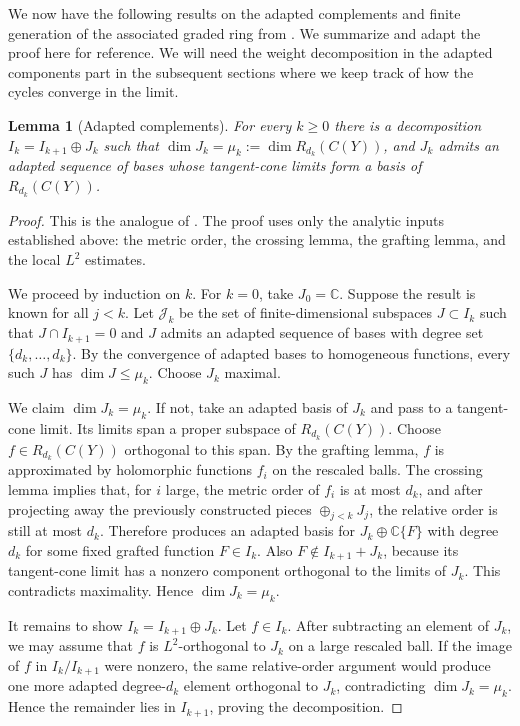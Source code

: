 \documentclass[11pt]{amsart}
\newtheorem{lemma}[theorem]{Lemma}
\theoremstyle{definition}
\theoremstyle{remark}
\begin{document}
We now have the following results on the adapted complements and finite generation
of the associated graded ring from \cite[Section~3.2]{DSII}. We summarize and adapt the proof here for reference. We will need the weight decomposition in the adapted components part in the
subsequent sections where we keep track of how the cycles converge in the limit.

\begin{lemma}[Adapted complements]
For every $k\geq0$ there is a decomposition $I_k=I_{k+1}\oplus J_k$ such that
$\dim J_k=\mu_k:=\dim R_{d_k}(C(Y))$, and $J_k$ admits an adapted sequence of
bases whose tangent-cone limits form a basis of $R_{d_k}(C(Y))$.
\end{lemma}

\begin{proof}
This is the analogue of \cite[Proposition 3.14]{DSII}. The proof uses only the
analytic inputs established above: the metric order, the crossing lemma, the
grafting lemma, and the local $L^2$ estimates.

We proceed by induction on $k$. For $k=0$, take $J_0=\mathbb C$. Suppose the
result is known for all $j<k$. Let $\mathcal J_k$ be the set of finite-dimensional
subspaces $J\subset I_k$ such that $J\cap I_{k+1}=0$ and $J$ admits an adapted
sequence of bases with degree set $\{d_k,\dots,d_k\}$. By the convergence of
adapted bases to homogeneous functions, every such $J$ has $\dim J\leq\mu_k$.
Choose $J_k$ maximal.

We claim $\dim J_k=\mu_k$. If not, take an adapted basis of $J_k$ and pass to a
tangent-cone limit. Its limits span a proper subspace of $R_{d_k}(C(Y))$. Choose
$f\in R_{d_k}(C(Y))$ orthogonal to this span. By the grafting lemma, $f$ is
approximated by holomorphic functions $f_i$ on the rescaled balls. The crossing
lemma implies that, for $i$ large, the metric order of $f_i$ is at most $d_k$,
and after projecting away the previously constructed pieces $\oplus_{j<k}J_j$,
the relative order is still at most $d_k$. Therefore \cite[Proposition~3.12]{DSII}
produces an adapted basis for $J_k\oplus\mathbb C\{F\}$ with degree $d_k$ for
some fixed grafted function $F\in I_k$. Also $F\notin I_{k+1}+J_k$, because its
tangent-cone limit has a nonzero component orthogonal to the limits of $J_k$.
This contradicts maximality. Hence $\dim J_k=\mu_k$.

It remains to show $I_k=I_{k+1}\oplus J_k$. Let $f\in I_k$. After subtracting an
element of $J_k$, we may assume that $f$ is $L^2$-orthogonal to $J_k$ on a large
rescaled ball. If the image of $f$ in $I_k/I_{k+1}$ were nonzero, the same
relative-order argument would produce one more adapted degree-$d_k$ element
orthogonal to $J_k$, contradicting $\dim J_k=\mu_k$. Hence the remainder lies in
$I_{k+1}$, proving the decomposition.
\end{proof}
\end{document}
